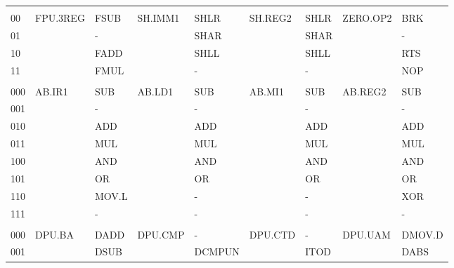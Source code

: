 \begin{table}
\begin{center}
\begin{tabular}{l|ll|ll|ll|ll}
     &            &          &           &                 &            &                 &            &           \\
00   & FPU.3REG   & FSUB     & SH.IMM1   & SHLR            & SH.REG2    & SHLR            & ZERO.OP2   & BRK       \\
01   &            & -        &           & SHAR            &            & SHAR            &            & -         \\
10   &            & FADD     &           & SHLL            &            & SHLL            &            & RTS       \\
11   &            & FMUL     &           & -               &            & -               &            & NOP       \\
     &            &          &           &                 &            &                 &            &           \\
000  & AB.IR1     & SUB      & AB.LD1    & SUB             & AB.MI1     & SUB             & AB.REG2    & SUB       \\
001  &            & -        &           & -               &            & -               &            & -         \\
010  &            & ADD      &           & ADD             &            & ADD             &            & ADD       \\
011  &            & MUL      &           & MUL             &            & MUL             &            & MUL       \\
100  &            & AND      &           & AND             &            & AND             &            & AND       \\
101  &            & OR       &           & OR              &            & OR              &            & OR        \\
110  &            & MOV.L    &           & -               &            & -               &            & XOR       \\
111  &            & -        &           & -               &            & -               &            & -         \\
     &            &          &           &                 &            &                 &            &           \\
000  & DPU.BA     & DADD     & DPU.CMP   & -               & DPU.CTD    & -               & DPU.UAM    & DMOV.D    \\
001  &            & DSUB     &           & DCMPUN          &            & ITOD            &            & DABS      \\

\end{tabular}
\end{center}
\end{table}
